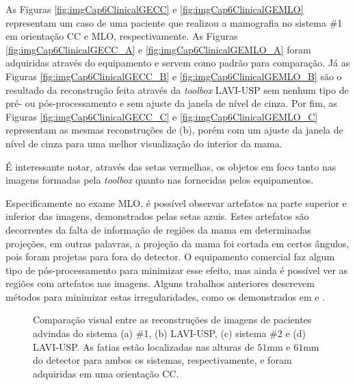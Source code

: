 As Figuras \ref{fig:imgCap6ClinicalGECC} e \ref{fig:imgCap6ClinicalGEMLO} representam um caso de uma paciente que realizou a mamografia no sistema \#1 em orientação \acs{CC} e \acs{MLO}, respectivamente. As Figuras \ref{fig:imgCap6ClinicalGECC_A} e \ref{fig:imgCap6ClinicalGEMLO_A} foram adquiridas através do equipamento e servem como  padrão para comparação. Já as Figuras \ref{fig:imgCap6ClinicalGECC_B} e \ref{fig:imgCap6ClinicalGEMLO_B} são o resultado da reconstrução feita através da \textit{toolbox} LAVI-USP sem nenhum tipo de pré- ou pós-processamento e sem ajuste da janela de nível de cinza. Por fim, as Figuras \ref{fig:imgCap6ClinicalGECC_C} e \ref{fig:imgCap6ClinicalGEMLO_C} representam as mesmas reconstruções de (b), porém com um ajuste da janela de nível de cinza para uma melhor visualização do interior da mama.  

É interessante notar, através das setas vermelhas, os objetos em foco tanto nas imagens formadas pela \textit{toolbox} quanto nas fornecidas pelos equipamentos. 

Especificamente no exame \acs{MLO}, é possível observar artefatos na parte superior e inferior das imagens, demonstrados pelas setas azuis. Estes artefatos são decorrentes da falta de informação de regiões da mama em determinadas projeções, em outras palavras, a projeção da mama foi cortada em certos ângulos, pois foram projetas para fora do detector. O equipamento comercial faz algum tipo de pós-processamento para minimizar esse efeito, mas ainda é possível ver as regiões com artefatos nas imagens. Alguns trabalhos anteriores descrevem métodos para minimizar estas irregularidades, como os demonstrados em  e .


\begin{figure}[htb]
	\centering	
	\caption{Comparação visual entre as reconstruções de imagens de pacientes advindas do sistema (a) \#1, (b) LAVI-USP, (c) sistema \#2 e (d) LAVI-USP. As fatias estão localizadas nas alturas de $51$mm e $61$mm do detector para ambos os sistemas, respectivamente, e foram adquiridas em uma orientação \acs{CC}.}
	
	\hfill
	\hfill
	\hfill
	\label{fig:imgCap6ClinicalRecon}
\end{figure}

